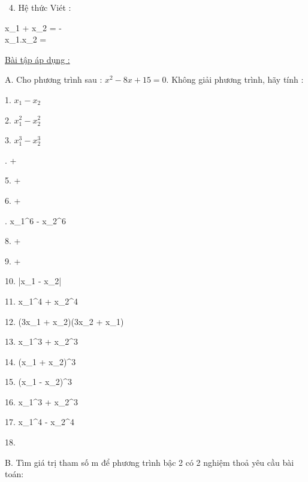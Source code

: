 \documentclass[12pt]{article}
\begin{document}
\   
4. Hệ thức Viét : \par
\begin{cases}
    x_1 + x_2 = - \\
    x_1.x_2 = 
\end{cases}

\underline{Bài tập áp dụng :} \par
A. Cho phương trình sau : $x^2 - 8x + 15 = 0$. Không giải phương trình, hãy tính : \par

\begin{multicols}{3}
1. $x_1 - x_2$ \par
2. $x_1^2 - x_2^2$ \par
3. $x_1^3 - x_2^3$ \par
{}.  +  \par
5.  +  \par
6.  +  \par
{}. x_1^6 - x_2^6 \par
8.  +  \par
9.  +  \par
\end{multicols}

\begin{multicols}{3}

10. |x_1 - x_2| \par
11. x_1^4 + x_2^4 \par
12. (3x_1 + x_2)(3x_2 + x_1) \par

\columnbreak

13. x_1^3 + x_2^3 \par
14. (x_1 + x_2)^3 \par
15. (x_1 - x_2)^3 \par

\columnbreak

16. x_1^3 + x_2^3 \par
17. x_1^4 - x_2^4 \par
18.  \par

\end{multicols}

B. Tìm giá trị tham số m để phương trình bậc 2 có 2 nghiệm thoả yêu cầu bài toán:
\end{document}
